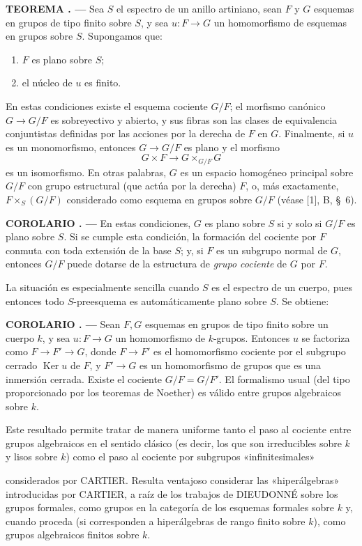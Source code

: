 \documentclass[11pt,twoside,openany]{book}
\numberwithin{equation}{section}
\newcommand{\src}[1]{%
  \phantomsection\hypertarget{src:#1}{}%
  \marginpar{\raggedleft\footnotesize\sffamily #1}%
}
\theoremstyle{plain}
\theoremstyle{definition}
\theoremstyle{remark}
\newcommand{\result}[2]{%
  \par\medskip\noindent\textbf{#1%
  \if\relax\detokenize{#2}\relax\else\space#2\fi. ---}\enspace
}
\newcommand{\FgaUnitKey}{frontmatter}
\renewcommand{\src}[1]{%
  \phantomsection\hypertarget{src:\FgaUnitKey:#1}{}%
  \marginpar{\raggedleft\footnotesize\sffamily #1}%
}
\theoremstyle{plain}
\theoremstyle{definition}
\theoremstyle{remark}
\begin{document}
\result{TEOREMA}{7.2} Sea $S$ el espectro de un anillo artiniano, sean $F$ y
$G$ esquemas en grupos de tipo finito sobre $S$, y sea $u:F\to G$ un
homomorfismo de esquemas en grupos sobre $S$. Supongamos que:
\begin{enumerate}
\item[(i)] $F$ es plano sobre $S$;
\item[(ii)] el núcleo de $u$ es finito.
\end{enumerate}
En estas condiciones existe el esquema cociente $G/F$; el morfismo canónico
$G\to G/F$ es sobreyectivo y abierto, y sus fibras son las clases de
equivalencia conjuntistas definidas por las acciones por la derecha de $F$ en
$G$. Finalmente, si $u$ es un monomorfismo, entonces $G\to G/F$ es plano y
el morfismo
\[
  G\times F\longrightarrow G\times_{G/F}G
\]
es un isomorfismo. En otras palabras, $G$ es un espacio homogéneo principal
sobre $G/F$ con grupo estructural (que actúa por la derecha) $F$, o, más
exactamente, $F\times_S(G/F)$ considerado como esquema en grupos sobre $G/F$
(véase [1], B, \S~6).

\result{COROLARIO}{7.3} En estas condiciones, $G$ es plano sobre $S$ si y
solo si $G/F$ es plano sobre $S$. Si se cumple esta condición, la formación
del cociente por $F$ conmuta con toda extensión de la base $S$; y, si $F$ es
un subgrupo normal de $G$, entonces $G/F$ puede dotarse de la estructura de
\emph{grupo cociente} de $G$ por $F$.

La situación es especialmente sencilla cuando $S$ es el espectro de un
cuerpo, pues entonces todo $S$-preesquema es automáticamente plano sobre $S$.
Se obtiene:

\result{COROLARIO}{7.4} Sean $F,G$ esquemas en grupos de tipo finito sobre un
cuerpo $k$, y sea $u:F\to G$ un homomorfismo de $k$-grupos. Entonces $u$ se
factoriza como $F\to F'\to G$, donde $F\to F'$ es el homomorfismo cociente
por el subgrupo cerrado $\operatorname{Ker}u$ de $F$, y $F'\to G$ es un
homomorfismo de grupos que es una inmersión cerrada. Existe el cociente
$G/F=G/F'$. El formalismo usual (del tipo proporcionado por los teoremas de
Noether) es válido entre grupos algebraicos sobre $k$.

Este resultado permite tratar de manera uniforme tanto el paso al cociente
entre grupos algebraicos en el sentido clásico (es decir, los que son
irreducibles sobre $k$ y lisos sobre $k$) como el paso al cociente por
subgrupos «infinitesimales»
\src{116}
considerados por CARTIER. Resulta ventajoso considerar las «hiperálgebras»
introducidas por CARTIER, a raíz de los trabajos de DIEUDONNÉ sobre los grupos
formales, como grupos en la categoría de los esquemas formales sobre $k$ y,
cuando proceda (si corresponden a hiperálgebras de rango finito sobre $k$),
como grupos algebraicos finitos sobre $k$.
\end{document}
